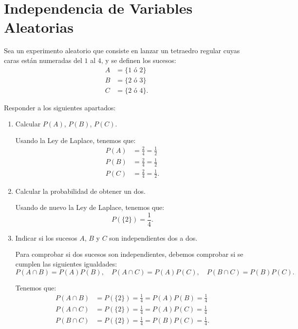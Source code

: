 \section{Independencia de Variables Aleatorias}


\begin{ejercicio}
    Sea un experimento aleatorio que consiste en lanzar un tetraedro regular cuyas caras están numeradas del $1$ al $4$, y se definen los sucesos:
    \begin{align*}
        A &= \{1 \text{ ó } 2\} \\
        B &= \{2 \text{ ó } 3\} \\
        C &= \{2 \text{ ó } 4\}.
    \end{align*}

    Responder a los siguientes apartados:
    \begin{enumerate}
        \item Calcular $P(A)$, $P(B)$, $P(C)$.
        
        Usando la Ley de Laplace, tenemos que:
        \begin{align*}
            P(A) &= \frac{2}{4} = \frac{1}{2} \\
            P(B) &= \frac{2}{4} = \frac{1}{2} \\
            P(C) &= \frac{2}{4} = \frac{1}{2}.
        \end{align*}

        \item Calcular la probabilidad de obtener un dos.
        
        Usando de nuevo la Ley de Laplace, tenemos que:
        \[
            P(\{2\}) = \frac{1}{4}.
        \]
        \item Indicar si los sucesos $A$, $B$ y $C$ son independientes dos a dos.
        
        Para comprobar si dos sucesos son independientes, debemos comprobar si se cumplen las siguientes igualdades:
        \[
            P(A \cap B) = P(A)P(B), \quad P(A \cap C) = P(A)P(C), \quad P(B \cap C) = P(B)P(C).
        \]

        Tenemos que:
        \begin{align*}
            P(A \cap B) &= P(\{2\}) = \frac{1}{4} = P(A)P(B) = \frac{1}{4} \\
            P(A \cap C) &= P(\{2\}) = \frac{1}{4} = P(A)P(C) = \frac{1}{4} \\
            P(B \cap C) &= P(\{2\}) = \frac{1}{4} = P(B)P(C) = \frac{1}{4}.
        \end{align*}


\end{enumerate}
\end{ejercicio}
